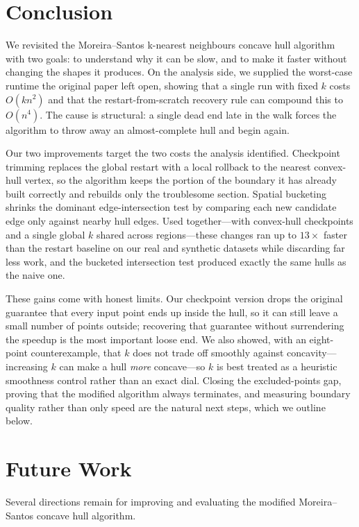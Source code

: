 \documentclass[10pt,twocolumn]{article}
\begin{document}
\section{Conclusion}
We revisited the Moreira--Santos k-nearest neighbours concave hull algorithm with two goals: to understand why it can be slow, and to make it faster without changing the shapes it produces. On the analysis side, we supplied the worst-case runtime the original paper left open, showing that a single run with fixed $k$ costs $O(kn^2)$ and that the restart-from-scratch recovery rule can compound this to $O(n^4)$. The cause is structural: a single dead end late in the walk forces the algorithm to throw away an almost-complete hull and begin again.

Our two improvements target the two costs the analysis identified. Checkpoint trimming replaces the global restart with a local rollback to the nearest convex-hull vertex, so the algorithm keeps the portion of the boundary it has already built correctly and rebuilds only the troublesome section. Spatial bucketing shrinks the dominant edge-intersection test by comparing each new candidate edge only against nearby hull edges. Used together---with convex-hull checkpoints and a single global $k$ shared across regions---these changes ran up to $13\times$ faster than the restart baseline on our real and synthetic datasets while discarding far less work, and the bucketed intersection test produced exactly the same hulls as the naive one.

These gains come with honest limits. Our checkpoint version drops the original guarantee that every input point ends up inside the hull, so it can still leave a small number of points outside; recovering that guarantee without surrendering the speedup is the most important loose end. We also showed, with an eight-point counterexample, that $k$ does not trade off smoothly against concavity---increasing $k$ can make a hull \emph{more} concave---so $k$ is best treated as a heuristic smoothness control rather than an exact dial. Closing the excluded-points gap, proving that the modified algorithm always terminates, and measuring boundary quality rather than only speed are the natural next steps, which we outline below.

\section{Future Work} 
Several directions remain for improving and evaluating the modified Moreira--Santos concave hull algorithm.
\end{document}
